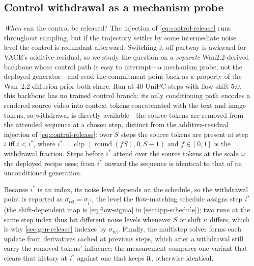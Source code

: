 \subsection{Control withdrawal as a mechanism probe}\label{sec:gen-withdrawal}

\emph{When} can the control be released? The injection of \cref{eq:control-release} runs throughout
sampling, but if the trajectory settles by some intermediate noise level the control is redundant
afterward. Switching it off partway is awkward for VACE's additive residual, so we study the question
on a \emph{separate} Wan2.2-derived backbone whose control path is easy to interrupt---a mechanism
probe, not the deployed generator---and read the commitment point back as a property of the Wan~2.2
diffusion prior both share. Run at $40$ UniPC steps with flow shift $5.0$, this backbone has no
trained control branch: its only conditioning path encodes a rendered source video into context
tokens concatenated with the text and image tokens, so withdrawal is directly available---the source
tokens are removed from the attended sequence at a chosen step, distinct from the additive-residual
injection of \cref{eq:control-release}: over $S$ steps the source tokens are present at step $i$ iff
$i<i^{*}$, where $i^{*}=\operatorname{clip}(\operatorname{round}(fS),0,S-1)$ and $f\in[0,1]$ is the
withdrawal fraction. Steps before $i^{*}$ attend over the source tokens at the scale
$\omega$ the deployed recipe uses; from $i^{*}$ onward the sequence is identical to that of an
unconditioned generation.

Because $i^{*}$ is an index, its noise level depends on the schedule, so the withdrawal point is
reported as $\sigma_{\mathrm{rel}}=\sigma_{i^{*}}$, the level the flow-matching schedule assigns step
$i^{*}$ (the shift-dependent map is \cref{eq:flow-sigma} in \cref{sec:app-schedule}); two runs at the
same step index thus hit different noise levels whenever $S$ or shift $\kappa$ differs, which is why
\cref{sec:gen-release} indexes by $\sigma_{\mathrm{rel}}$. Finally, the multistep solver forms each
update from derivatives cached at previous steps, which after a withdrawal still carry the removed
tokens' influence; the measurement compares one variant that clears that history at $i^{*}$ against
one that keeps it, otherwise identical.
